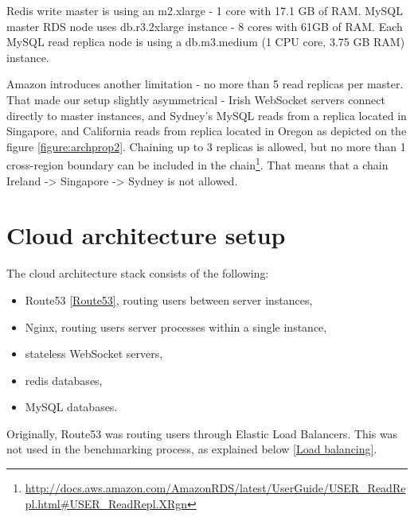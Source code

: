 \documentclass{uvamscse}
\begin{document}
Redis write master is using an m2.xlarge - 1 core with 17.1 GB of RAM. MySQL master RDS node uses db.r3.2xlarge instance - 8 cores with 61GB of RAM. Each MySQL read replica node is using a db.m3.medium (1 CPU core, 3.75 GB RAM) instance.

Amazon introduces another limitation - no more than 5 read replicas per master. That made our setup slightly asymmetrical - Irish WebSocket servers connect directly to master instances, and Sydney's MySQL reads from a replica located in Singapore, and California reads from replica located in Oregon as depicted on the figure \ref{figure:archprop2}. Chaining up to 3 replicas is allowed, but no more than 1 cross-region boundary can be included in the chain\footnote{\url{http://docs.aws.amazon.com/AmazonRDS/latest/UserGuide/USER_ReadRepl.html\#USER\_ReadRepl.XRgn}}. That means that a chain Ireland -> Singapore -> Sydney is not allowed.

\section{Cloud architecture setup} \label{Cloud architecture setup}
The cloud architecture stack consists of the following:
\begin{itemize}
  \item Route53 \ref{Route53}, routing users between server instances,
  \item Nginx, routing users server processes within a single instance,
  \item stateless WebSocket servers,
  \item redis databases,
  \item MySQL databases.
\end{itemize}

Originally, Route53 was routing users through Elastic Load Balancers. This was not used in the benchmarking process, as explained below \ref{Load balancing}.
\end{document}
